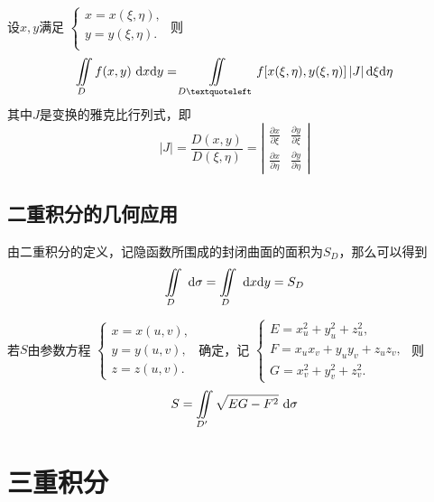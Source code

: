 \ttheorem[一般变换]
设$x,y$满足
$
\begin{cases}
	x = x(\xi,\eta),\\
	y = y(\xi,\eta). \\
\end{cases}
$
则
\begin{equation}
	\iint\limits_{D}f(x,y)\,\, \d x \d y= \iint\limits_{D‘}f[x(\xi,\eta),y(\xi,\eta)]\,|J|\, \d \xi \d \eta
\end{equation}
其中$J$是变换的雅克比行列式，即
\renewcommand{\arraystretch}{1.5}
\begin{equation*}
	|J|=\frac{D(x,y)}{D(\xi,\eta)}=
	\left| 
	\begin{array}{cc}
		\displaystyle \frac{\partial x}{\partial \xi} & \displaystyle \frac{\partial y}{\partial \xi} \\
		\displaystyle \frac{\partial x}{\partial \eta} & \displaystyle \frac{\partial y}{\partial \eta} 
	\end{array}
	\right| 
\end{equation*}
\renewcommand{\arraystretch}{1}

\subsection{二重积分的几何应用}
\sj
\example[求隐函数的平面面积]
由二重积分的定义，记隐函数所围成的封闭曲面的面积为$S_D$，那么可以得到
\begin{equation}
	\iint\limits_{D} \, \, {\rm{d}} \sigma=\iint\limits_{D}\, \, {\rm{d}} x {\rm{d}} y=S_D
\end{equation}

\example[求空间曲面的面积]
若$S$由参数方程
$
\begin{cases}
	x = x(u,v),\\
	y = y(u,v),\\
	z= z(u,v).
\end{cases}
$
确定，记
$
\begin{cases}
	E = x_u^2 + y_u^2 +z_u^2,\\
	F = x_ux_v + y_uy_v + z_uz_v,\\
	G = x_v^2 + y_v^2 +z_v^2.
\end{cases}
$
则
\begin{equation}
	S=\iint\limits_{D'} \sqrt{EG-F^2}\, \, {\rm{d}} \sigma
\end{equation}

\section{三重积分}
